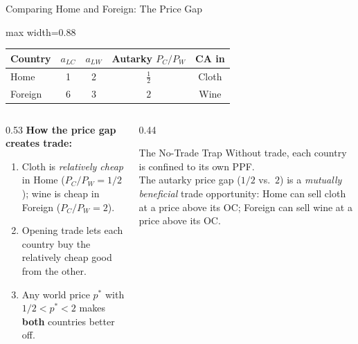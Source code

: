 \documentclass[aspectratio=169]{beamer}
\begin{document}
\begin{frame}{Comparing Home and Foreign: The Price Gap}
\begin{center}
\begin{adjustbox}{max width=0.88\textwidth}
\begin{tabular}{lcccc}
\toprule
\textbf{Country}&$a_{LC}$&$a_{LW}$&
\textbf{Autarky $P_C/P_W$}&\textbf{CA in}\\
\midrule
Home   & 1 & 2 & $\tfrac{1}{2}$ & Cloth\\
Foreign& 6 & 3 & $2$            & Wine\\
\bottomrule
\end{tabular}
\end{adjustbox}
\end{center}
\vspace{0.3em}
\begin{columns}[T]
\begin{column}{0.53\textwidth}
\textbf{How the price gap creates trade:}
\begin{enumerate}\small
  \item Cloth is \emph{relatively cheap} in Home
        ($P_C/P_W=1/2$); wine is cheap in Foreign
        ($P_C/P_W=2$).
  \item Opening trade lets each country buy the
        relatively cheap good from the other.
  \item Any world price $p^{*}$ with $1/2 < p^{*} < 2$
        makes \textbf{both} countries better off.
\end{enumerate}
\end{column}
\begin{column}{0.44\textwidth}
\begin{insight}{The No-Trade Trap}
\small Without trade, each country is confined to its
own PPF.\\[0.2em]
The autarky price gap ($1/2$ vs.\ $2$) is a
\emph{mutually beneficial} trade opportunity: Home
can sell cloth at a price above its OC; Foreign can
sell wine at a price above its OC.
\end{insight}
\end{column}
\end{columns}
\end{frame}
\end{document}

